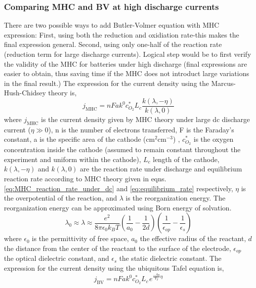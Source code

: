 \documentclass[12pt]{book}
\begin{document}
\subsubsection {Comparing MHC and BV at high discharge currents}
There are two possible ways to add Butler-Volmer equation with MHC expression: First, using both the reduction and oxidiation rate-this makes the final expression general. Second, using only one-half of the reaction rate (reduction term for large discharge currents). Logical step would be to first verify the validity of the MHC for batteries under high discharge (final expressions are easier to obtain, thus saving time if the MHC does not introduct large variations in the final result.) The expression for the current density using the Marcus-Hush-Chidsey theory is,
\begin{equation}
j_{\textrm{MHC}}=nFak^{0}c_{O_{2}}^{*}L_{c}\frac{k\left(\lambda,-\eta\right)}{k\left(\lambda,0\right)}
\end{equation}
where $j_{\textrm{MHC}}$ is the current density given by MHC theory under large dc discharge current ($\eta\gg0$), n is the number of electrons transferred, F is the Faraday's constant, a is the specific area of the cathode ($\textrm{cm}^{2}\textrm{cm}^{-3}$) , $c_{O_{2}}^{*}$ is the oxygen concentration inside the cathode (assumed to remain constant throughout the experiment and uniform within the cathode), $L_{c}$ length of the cathode, $k\left(\lambda,-\eta\right)$ and $k\left(\lambda,0\right)$ are the reaction rate under discharge and equilibrium reaction rate according to MHC theory given in eqns.\ref{eq:MHC_reaction_rate_under_dc} and \ref{eq:equilibrium_rate} respectively, $\eta$ is the overpotential of the reaction, and $\lambda$ is the reorganization energy. The reorganization energy can be approximated using Born energy of solvation.
\begin{equation}
\lambda_{0}\approx\lambda\approx\frac{e^{2}}{8\pi\epsilon_{0}k_{B}T}\left(\frac{1}{a_{0}}-\frac{1}{2d}\right)\left(\frac{1}{\epsilon_{op}}-\frac{1}{\epsilon_{s}}\right)
\end{equation}
where $\epsilon_{0}$ is the permittivity of free space, $a_{0}$ the effective radius of the reactant, $d$ the distance from the center of the reactant to the surface of the electrode, $\epsilon_{op}$ the optical dielectric constant, and $\epsilon_{s}$ the static dielectric constant. The expression for the current density using the ubiquitous Tafel equation is,
\begin{equation}
j_{\textrm{BV}}=nFak^{0}c_{O_{2}}^{*}L_{c\,}e^{\frac{-\beta n}{V_{T}}\eta}
\end{equation}
\end{document}
